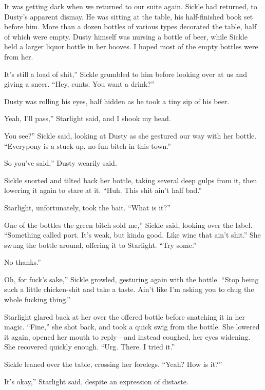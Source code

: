 It was getting dark when we returned to our suite again. Sickle had returned, to Dusty’s apparent dismay. He was sitting at the table, his half-finished book set before him. More than a dozen bottles of various types decorated the table, half of which were empty. Dusty himself was nursing a bottle of beer, while Sickle held a larger liquor bottle in her hooves. I hoped most of the empty bottles were from her.

\leavevmode{}It’s still a load of shit,” Sickle grumbled to him before looking over at us and giving a sneer. “Hey, cunts. You want a drink?”

Dusty was rolling his eyes, half hidden as he took a tiny sip of his beer.

\leavevmode{}Yeah, I’ll pass,” Starlight said, and I shook my head.

\leavevmode{}You see?” Sickle said, looking at Dusty as she gestured our way with her bottle. “Everypony is a stuck-up, no-fun bitch in this town.”

\leavevmode{}So you’ve said,” Dusty wearily said.

Sickle snorted and tilted back her bottle, taking several deep gulps from it, then lowering it again to stare at it. “Huh. This shit ain’t half bad.”

Starlight, unfortunately, took the bait. “What is it?”

\leavevmode{}One of the bottles the green bitch sold me,” Sickle said, looking over the label. “Something called port. It’s weak, but kinda good. Like wine that ain’t shit.” She swung the bottle around, offering it to Starlight. “Try some.”

\leavevmode{}No thanks.”

\leavevmode{}Oh, for fuck’s sake,” Sickle growled, gesturing again with the bottle. “Stop being such a little chicken-shit and take a taste. Ain’t like I’m asking you to chug the whole fucking thing.”

Starlight glared back at her over the offered bottle before snatching it in her magic. “Fine,” she shot back, and took a quick swig from the bottle. She lowered it again, opened her mouth to reply—and instead coughed, her eyes widening. She recovered quickly enough. “Urg. There. I tried it.”

Sickle leaned over the table, crossing her forelegs. “Yeah? How is it?”

\leavevmode{}It’s okay,” Starlight said, despite an expression of distaste.

